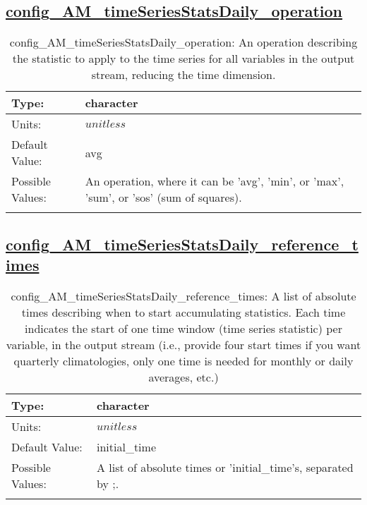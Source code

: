 \subsection[config\_AM\_timeSeriesStatsDaily\_operation]{\hyperref[sec:nm_tab_AM_timeSeriesStatsDaily]{config\_AM\_timeSeriesStatsDaily\_operation}}
\label{subsec:nm_sec_config_AM_timeSeriesStatsDaily_operation}
\begin{center}
\begin{longtable}{| p{2.0in} || p{4.0in} |}
    \hline
    Type: & character \\
    \hline
    Units: & $unitless$ \\
    \hline
    Default Value: & avg \\
    \hline
    Possible Values: & An operation, where it can be 'avg', 'min', or 'max', 'sum', or 'sos' (sum of squares). \\
    \hline
    \caption{config\_AM\_timeSeriesStatsDaily\_operation: An operation describing the statistic to apply to the time series for all variables in the output stream, reducing the time dimension.}
\end{longtable}
\end{center}
\subsection[config\_AM\_timeSeriesStatsDaily\_reference\_times]{\hyperref[sec:nm_tab_AM_timeSeriesStatsDaily]{config\_AM\_timeSeriesStatsDaily\_reference\_times}}
\label{subsec:nm_sec_config_AM_timeSeriesStatsDaily_reference_times}
\begin{center}
\begin{longtable}{| p{2.0in} || p{4.0in} |}
    \hline
    Type: & character \\
    \hline
    Units: & $unitless$ \\
    \hline
    Default Value: & initial\_time \\
    \hline
    Possible Values: & A list of absolute times or 'initial\_time's, separated by ;. \\
    \hline
    \caption{config\_AM\_timeSeriesStatsDaily\_reference\_times: A list of absolute times describing when to start accumulating statistics. Each time indicates the start of one time window (time series statistic) per variable, in the output stream (i.e., provide four start times if you want quarterly climatologies, only one time is needed for monthly or daily averages, etc.)}
\end{longtable}
\end{center}
